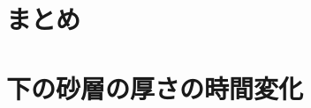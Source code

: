 \documentclass[dvipdfmx]{article}
\begin{document}
\section{まとめ}
%



 


\appendix

\section{下の砂層の厚さの時間変化}\label{250919092352}
\end{document}
